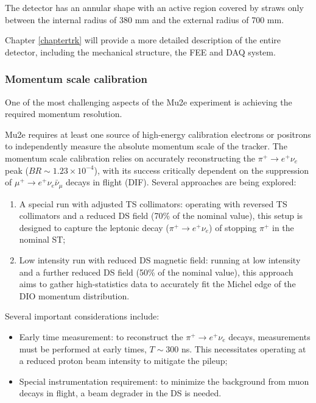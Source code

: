 The detector has an annular shape with an active region covered by straws only between the 
internal radius of 380 mm and the external radius of 700 mm.  

Chapter \ref{chaptertrk} will provide a more detailed description of the entire detector, 
including the mechanical structure, the FEE and 
DAQ system.
\subsubsection{Momentum scale calibration}
One of the most challenging aspects of the Mu2e experiment is achieving the 
required momentum resolution.


Mu2e requires at least one source of high-energy calibration electrons or 
positrons to independently measure the absolute momentum scale of the tracker. 
The momentum scale calibration relies on accurately reconstructing the 
$\pi^+ \rightarrow e^+ \nu_e$ peak ($BR\sim 1.23 \times 10^{-4}$), with its success critically dependent on the 
suppression of $\mu^+ \rightarrow e^+ \nu_e \bar{\nu}_\mu$ decays in flight (DIF). 
Several approaches are being explored:

\begin{enumerate}
    \item A special run with adjusted TS collimators: operating with 
    reversed TS collimators and a reduced DS field 
    (70\% of the nominal value), this setup is designed to capture the 
    leptonic decay ($\pi^+ \rightarrow e^+ \nu_e$) of stopping $\pi^+$ in the nominal ST;
    
    \item Low intensity run with reduced DS magnetic field: 
    running at low intensity and a further reduced DS field 
    (50\% of the nominal value), 
    this approach aims to gather high-statistics data to accurately fit 
    the Michel edge of the DIO momentum distribution.
\end{enumerate}

Several important considerations include:

\begin{itemize}
    \item Early time measurement: to reconstruct the $\pi^+ \rightarrow e^+ \nu_e$ decays, 
    measurements must be performed at early times,  
    $T \sim 300$ ns. This necessitates operating at a reduced proton 
    beam intensity to mitigate the pileup;
    
    \item Special instrumentation requirement: to minimize 
      the background from muon decays in flight, a beam degrader
      in the DS is needed.
\end{itemize}


